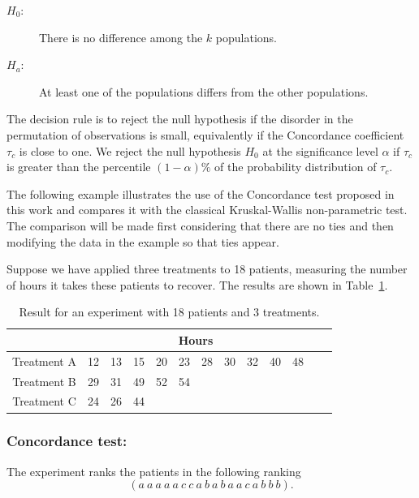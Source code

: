 \begin{description}
\item[$H_0$:] There is no difference among the $k$ populations.
\item[$H_a$:]  At least one of the populations differs from the other populations. 
\end{description}

The decision rule is to reject the null hypothesis if the disorder in the permutation of observations is small, equivalently if the Concordance coefficient $\tau_c$ is close to one. We reject the null hypothesis $H_0$ at the significance level $\alpha$ if $\tau_c$ is greater than the percentile $(1-\alpha)\%$ of the probability distribution of $\tau_c$. 

The following example illustrates the use of the Concordance test proposed in this work and compares it with the classical Kruskal-Wallis non-parametric test. The comparison will be made first considering that there are no ties and then modifying the data in the example so that ties appear.

\begin{exmp} \label{ex:18patients} Suppose we have applied three treatments to 18 patients, measuring the number of hours it takes these patients to recover. The results are shown in Table~\ref{t:example2}. \\

\begin{table}[h] \centering
\begin{tabular}{ccccccccccccc} \toprule
 & \multicolumn{10}{c}{Hours}\\ \hline
Treatment A & 12 & 13 & 15 & 20& 23 & 28 & 30 & 32 & 40 & 48 \\ \hline
Treatment B & 29& 31& 49 & 52 & 54 & & & & & \\ \hline
Treatment C & 24 & 26 & 44 & & & & & & &\\ \bottomrule[0.2mm]
\end{tabular}
 \caption{Result for an experiment with 18 patients and 3 treatments.}
  \label{t:example2}
\end{table}
\end{exmp}

\subsubsection{Concordance test:}

The experiment ranks the patients in the following ranking $$ (a\ a\ a\ a\ a\ c\ c\ a\ b\ a\ b\ a\ a\ c\ a\ b\ b\ b).$$

